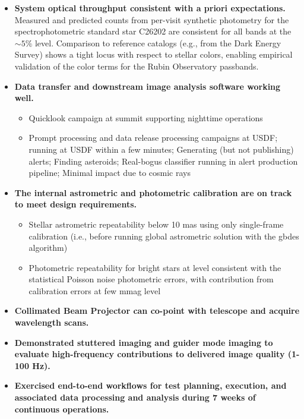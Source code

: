 \begin{itemize}
    \item \textbf{System optical throughput consistent with a priori expectations.} Measured and predicted counts from per-visit synthetic photometry for the spectrophotometric standard star C26202 are consistent for all bands at the $\sim5\%$ level.
    Comparison to reference catalogs (e.g., from the Dark Energy Survey) shows a tight locus with respect to stellar colors, enabling empirical validation of the color terms for the Rubin Observatory passbands.
    \item \textbf{Data transfer and downstream image analysis software working well.}
    \begin{itemize}
        \item Quicklook campaign at summit supporting nighttime operations
        \item Prompt processing and data release processing campaigns at USDF; running at USDF within a few minutes; Generating (but not publishing) alerts; Finding asteroids; Real-bogus classifier running in alert production pipeline; Minimal impact due to cosmic rays
    \end{itemize}
    \item \textbf{The internal astrometric and photometric calibration are on track to meet design requirements.}
    \begin{itemize}
        \item Stellar astrometric repeatability below 10 mas using only single-frame calibration (i.e., before running global astrometric solution with the gbdes algorithm)
        \item Photometric repeatability for bright stars at level consistent with the statistical Poisson noise photometric errors, with contribution from calibration errors at few mmag level
    \end{itemize}
    \item \textbf{Collimated Beam Projector can co-point with telescope and acquire wavelength scans.}
    \item \textbf{Demonstrated stuttered imaging and guider mode imaging to evaluate high-frequency contributions to delivered image quality (1-100 Hz).}
    \item \textbf{Exercised end-to-end workflows for test planning, execution, and associated data processing and analysis during 7 weeks of continuous operations.}
    \begin{itemize}

\end{itemize}
\end{itemize}
